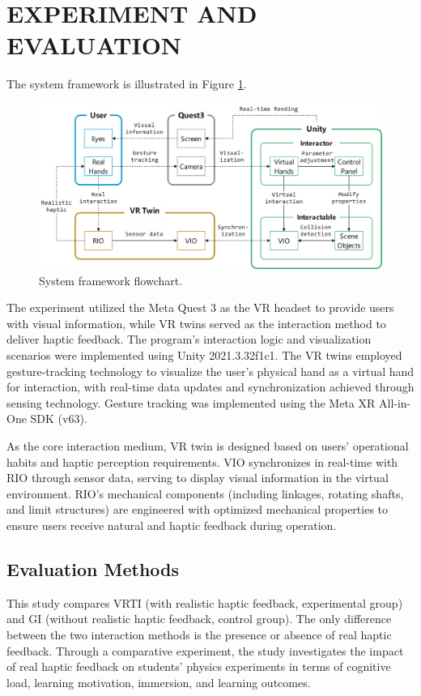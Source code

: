 \documentclass[runningheads]{llncs}
\begin{document}
\section{EXPERIMENT AND EVALUATION}
The system framework is illustrated in Figure \ref{fig:system-framework-flowchart}.

\begin{figure}[t]
  \centering
  \includegraphics[width=1\textwidth]{image/system-framework-flowchart.pdf}
  \caption{System framework flowchart.}
  \label{fig:system-framework-flowchart}
\end{figure}

The experiment utilized the Meta Quest 3 as the VR headset to provide users with visual information, while VR twins served as the interaction method to deliver haptic feedback. The program's interaction logic and visualization scenarios were implemented using Unity 2021.3.32f1c1. The VR twins employed gesture-tracking technology to visualize the user's physical hand as a virtual hand for interaction, with real-time data updates and synchronization achieved through sensing technology. Gesture tracking was implemented using the Meta XR All-in-One SDK (v63).

As the core interaction medium, VR twin is designed based on users' operational habits and haptic perception requirements. VIO synchronizes in real-time with RIO through sensor data, serving to display visual information in the virtual environment. RIO's mechanical components (including linkages, rotating shafts, and limit structures) are engineered with optimized mechanical properties to ensure users receive natural and haptic feedback during operation.

\subsection{Evaluation Methods}
This study compares VRTI (with realistic haptic feedback, experimental group) and GI (without realistic haptic feedback, control group). The only difference between the two interaction methods is the presence or absence of real haptic feedback. Through a comparative experiment, the study investigates the impact of real haptic feedback on students' physics experiments in terms of cognitive load, learning motivation, immersion, and learning outcomes.
\end{document}
